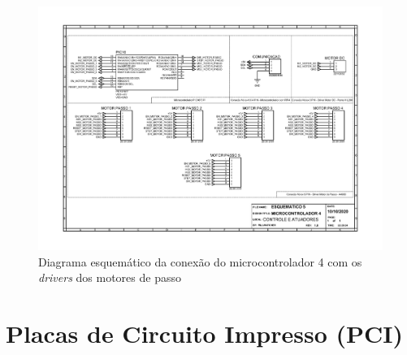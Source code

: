 \begin{apendicesenv}
\begin{landscape}
\begin{figure}[H]
    \centering
    \includegraphics[width=1.25\textwidth, height=2\textheight,keepaspectratio]{figuras/esquematico_eletronica/esquematico_5_micro4.pdf}
    \caption{Diagrama esquemático da conexão do microcontrolador 4 com os \textit{drivers} dos motores de passo}
    \label{fig:esquematico_5}
\end{figure}
\end{landscape}

\chapter{Placas de Circuito Impresso (PCI)}\label{app:PCB}


\end{apendicesenv}
